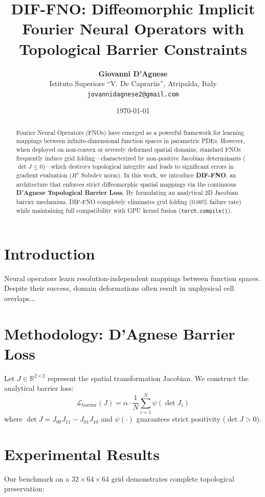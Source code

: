\documentclass[11pt,a4paper]{article}
\title{\textbf{DIF-FNO: Diffeomorphic Implicit Fourier Neural Operators with Topological Barrier Constraints}}
\author{\textbf{Giovanni D'Agnese}\\
\small Istituto Superiore ``V. De Caprariis'', Atripalda, Italy\\
\small \texttt{jovannidagnese2@gmail.com}}
\date{\today}
\begin{document}
\maketitle

\begin{abstract}
Fourier Neural Operators (FNOs) have emerged as a powerful framework for learning mappings between infinite-dimensional function spaces in parametric PDEs. However, when deployed on non-convex or severely deformed spatial domains, standard FNOs frequently induce grid folding—characterized by non-positive Jacobian determinants ($\det J \le 0$)—which destroys topological integrity and leads to significant errors in gradient evaluation ($H^1$ Sobolev norm). In this work, we introduce \textbf{DIF-FNO}, an architecture that enforces strict diffeomorphic spatial mappings via the continuous \textbf{D'Agnese Topological Barrier Loss}. By formulating an analytical 2D Jacobian barrier mechanism, DIF-FNO completely eliminates grid folding ($0.00\%$ failure rate) while maintaining full compatibility with GPU kernel fusion (\texttt{torch.compile()}).
\end{abstract}

\section{Introduction}
Neural operators learn resolution-independent mappings between function spaces. Despite their success, domain deformations often result in unphysical cell overlaps...

\section{Methodology: D'Agnese Barrier Loss}
Let $J \in \mathbb{R}^{2 \times 2}$ represent the spatial transformation Jacobian. We construct the analytical barrier loss:
\begin{equation}
\mathcal{L}_{\text{barrier}}(J) = \alpha \cdot \frac{1}{N} \sum_{i=1}^{N} \psi(\det J_i)
\end{equation}
where $\det J = J_{00}J_{11} - J_{01}J_{10}$ and $\psi(\cdot)$ guarantees strict positivity ($\det J > 0$).

\section{Experimental Results}
Our benchmark on a $32 \times 64 \times 64$ grid demonstrates complete topological preservation:
\end{document}
